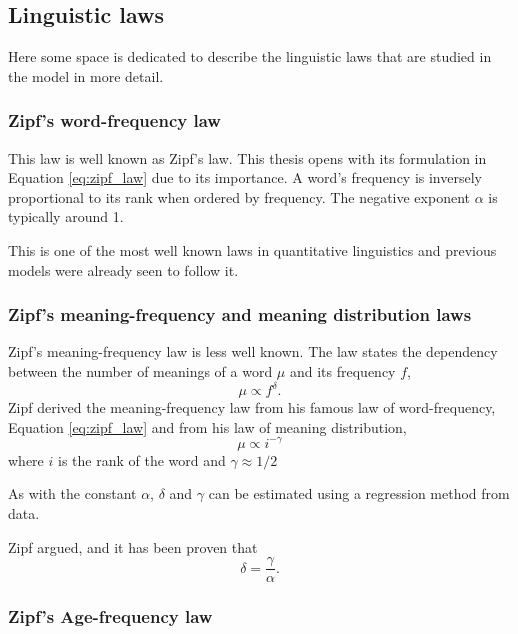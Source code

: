 \subsection{Linguistic laws}
\label{sec:introduction_background_linguistic-laws}

Here some space is dedicated to describe the linguistic laws that are studied in the model in more detail.

\subsubsection{Zipf's word-frequency law}

This law is well known as Zipf's law.
This thesis opens with its formulation in Equation \eqref{eq:zipf_law} due to its importance.
A word's frequency is inversely proportional to its rank when ordered by frequency.
The negative exponent $\alpha$ is typically around 1. \cite{Zipf1949a}

This is one of the most well known laws in quantitative linguistics and previous models were already seen to follow it. \cite{Ferrer2003a} \cite{Ferrer2005a}

\subsubsection{Zipf's meaning-frequency and meaning distribution laws}

Zipf's meaning-frequency law is less well known.
The law states the dependency between the number of meanings of a word $\mu$ and its frequency $f$, \cite{Zipf1949a}
\begin{equation*}
  \mu \propto f^\delta.
\end{equation*}
Zipf derived the meaning-frequency law from his famous law of word-frequency, Equation \eqref{eq:zipf_law} and from his law of meaning distribution,
\begin{equation*}
  \mu \propto i^{-\gamma}
\end{equation*}
where $i$ is the rank of the word and $\gamma \approx 1/2$

As with the constant $\alpha$, $\delta$ and $\gamma$ can be estimated using a regression method from data.

Zipf argued, and it has been proven \cite{Ferrer2016a} that
\begin{equation}
  \label{eq:relation-exponents}
  \delta = \frac{\gamma}{\alpha}.
\end{equation}

\subsubsection{Zipf's Age-frequency law}

